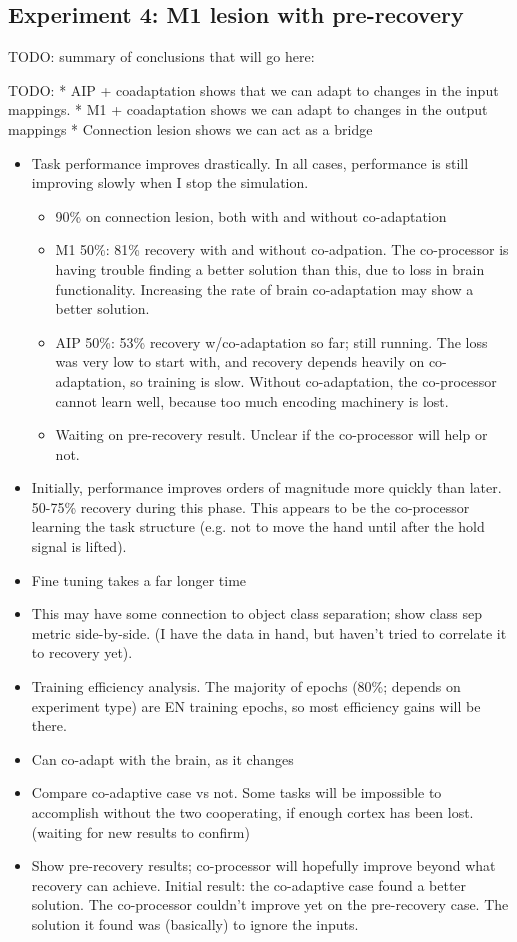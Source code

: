 \documentclass[12pt]{iopart}
\begin{document}
\subsection{Experiment 4: M1 lesion with pre-recovery}

TODO: summary of conclusions that will go here:

TODO:
* AIP + coadaptation shows that we can adapt to changes in the input mappings.
* M1 + coadaptation shows we can adapt to changes in the output mappings
* Connection lesion shows we can act as a bridge

\begin{itemize}
	\item Task performance improves drastically. In all cases, performance is still improving slowly when I stop the simulation.
		\begin{itemize}
			\item 90\% on connection lesion, both with and without co-adaptation
			\item M1 50\%: 81\% recovery with and without co-adpation. The co-processor is having trouble finding a better solution than this, due to loss in brain functionality. Increasing the rate of brain co-adaptation may show a better solution.
			\item AIP 50\%: 53\% recovery w/co-adaptation so far; still running. The loss was very low to start with, and recovery depends heavily on co-adaptation, so training is slow. Without co-adaptation, the co-processor cannot learn well, because too much encoding machinery is lost.
			\item Waiting on pre-recovery result. Unclear if the co-processor will help or not.
		\end{itemize}
	\item Initially, performance improves orders of magnitude more quickly than later. 50-75\% recovery during this phase. This appears to be the co-processor learning the task structure (e.g. not to move the hand until after the hold signal is lifted).
	\item Fine tuning takes a far longer time
	\item This may have some connection to object class separation; show class sep metric side-by-side. (I have the data in hand, but haven't tried to correlate it to recovery yet).
	\item Training efficiency analysis. The majority of epochs (80\%; depends on experiment type) are EN training epochs, so most efficiency gains will be there.
	\item Can co-adapt with the brain, as it changes
	\item Compare co-adaptive case vs not. Some tasks will be impossible to accomplish without the two cooperating, if enough cortex has been lost. (waiting for new results to confirm)
	\item Show pre-recovery results; co-processor will hopefully improve beyond what recovery can achieve. Initial result: the co-adaptive case found a better solution. The co-processor couldn't improve yet on the pre-recovery case. The solution it found was (basically) to ignore the inputs.
\end{itemize}
\end{document}
